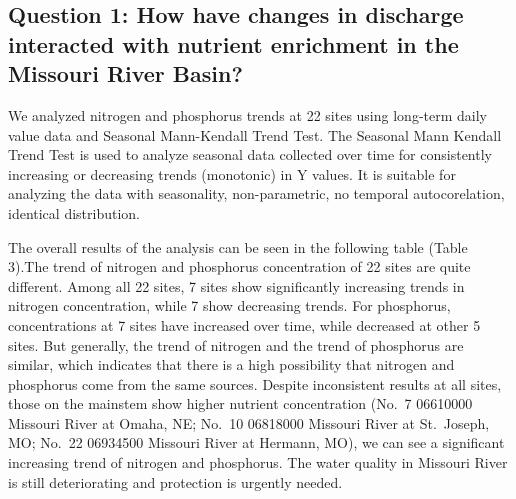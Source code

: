 \documentclass[12pt,]{article}
\begin{document}
\hypertarget{question-1-how-have-changes-in-discharge-interacted-with-nutrient-enrichment-in-the-missouri-river-basin}{%
\subsection{Question 1: How have changes in discharge interacted with
nutrient enrichment in the Missouri River
Basin?}\label{question-1-how-have-changes-in-discharge-interacted-with-nutrient-enrichment-in-the-missouri-river-basin}}

We analyzed nitrogen and phosphorus trends at 22 sites using long-term
daily value data and Seasonal Mann-Kendall Trend Test. The Seasonal Mann
Kendall Trend Test is used to analyze seasonal data collected over time
for consistently increasing or decreasing trends (monotonic) in Y
values. It is suitable for analyzing the data with seasonality,
non-parametric, no temporal autocorelation, identical distribution.

The overall results of the analysis can be seen in the following table
(Table 3).The trend of nitrogen and phosphorus concentration of 22 sites
are quite different. Among all 22 sites, 7 sites show significantly
increasing trends in nitrogen concentration, while 7 show decreasing
trends. For phosphorus, concentrations at 7 sites have increased over
time, while decreased at other 5 sites. But generally, the trend of
nitrogen and the trend of phosphorus are similar, which indicates that
there is a high possibility that nitrogen and phosphorus come from the
same sources. Despite inconsistent results at all sites, those on the
mainstem show higher nutrient concentration (No.~7 06610000 Missouri
River at Omaha, NE; No.~10 06818000 Missouri River at St.~Joseph, MO;
No.~22 06934500 Missouri River at Hermann, MO), we can see a significant
increasing trend of nitrogen and phosphorus. The water quality in
Missouri River is still deteriorating and protection is urgently needed.

\newpage
\end{document}
